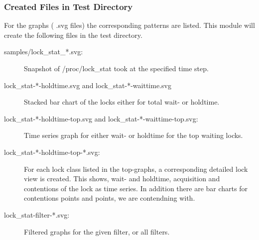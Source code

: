     \subsubsection{Created Files in Test Directory}
    For the graphs ( .svg files) the corresponding patterns are listed.
    This module will create the following files in the test directory.
    \begin{description}
        \item[samples/lock\_stat\_*.svg:]
            Snapshot of /proc/lock\_stat took at the specified time step.
        \item[lock\_stat-*-holdtime.svg and lock\_stat-*-waittime.svg]
            Stacked bar chart of the locks either for total wait- or holdtime.
        \item[lock\_stat-*-holdtime-top.svg and lock\_stat-*-waittime-top.svg:]
            Time series graph for either wait- or holdtime for the top waiting locks.
        \item[lock\_stat-*-holdtime-top-*.svg:]
            For each lock class listed in the top-graphs, a corresponding detailed lock view is created.
            This shows, wait- and holdtime, acquisition and contentions of the lock as time series.
            In addition there are bar charts for contentions points and points, we are contendning with.
        \item[lock\_stat-filter-*.svg:]
            Filtered graphs for the given filter, or all filters.
    \end{description}
